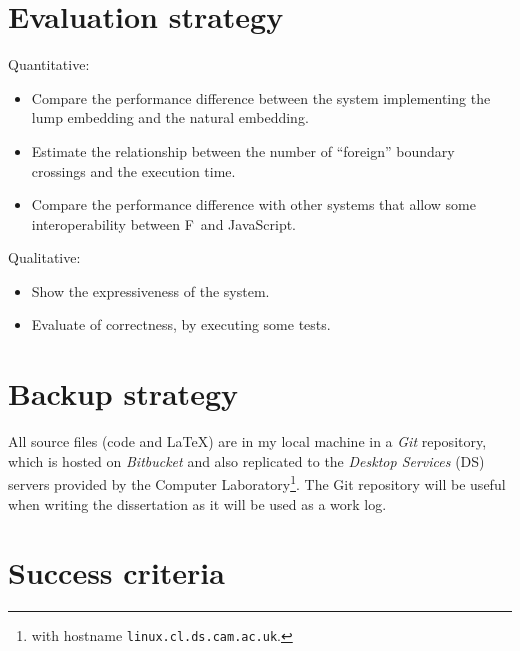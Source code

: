 \documentclass[12pt,a4paper, twoside]{article}
\newcommand{\fs}{F\nolinebreak\hspace{-.05em}\raisebox{.6ex}{\tiny\bf
    \#}}
\begin{document}
\section{Evaluation strategy}

Quantitative:
\begin{itemize}

\item Compare the performance difference between the system
implementing the lump embedding and the natural embedding.

\item Estimate the relationship between the number of “foreign”
  boundary crossings and the execution time.

\item Compare the performance difference with other systems that allow
  some interoperability between \fs\ and JavaScript.

\end{itemize}

Qualitative:
\begin{itemize}

\item Show the expressiveness of the system.

\item Evaluate of correctness, by executing some tests.

\end{itemize}


\section{Backup strategy}

All source files (code and \LaTeX) are in my local machine in a
\emph{Git} repository, which is hosted on \emph{Bitbucket} and also
replicated to the \emph{Desktop Services} (DS) servers provided by the
Computer Laboratory\footnote{with hostname
\texttt{linux.cl.ds.cam.ac.uk}.}.  The Git repository will be useful
when writing the dissertation as it will be used as a work log.

\section{Success criteria}
\end{document}
